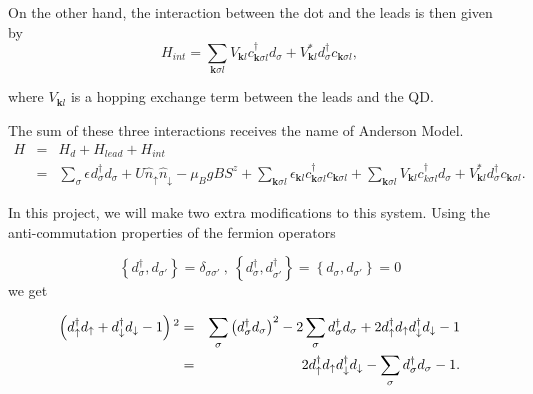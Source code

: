 On the other hand, the interaction between the dot and the leads is then given by 
\begin{equation}
H_{int} = \sum_{\mathbf{k}\sigma l}V_{\mathbf{k}l}c_{\mathbf{k}\sigma l}^{\dagger}d_{\sigma}+V_{\mathbf{k}l}^{*}d_{\sigma}^{\dagger}c_{\mathbf{k}\sigma l},
\end{equation}


\noindent where $V_{\mathbf{k}l}$ is a hopping exchange
term between the leads and the QD. 


The sum of these three interactions receives the name of Anderson Model. 
\begin{eqnarray}
H & = & H_{d}+H_{lead}+H_{int}\nonumber \\
 & = & \sum_{\sigma}\epsilon_{}d_{\sigma}^{\dagger}d_{\sigma}+U\hat{n}_{\uparrow}\hat{n}_{\downarrow}-\mu_{B}gBS^{z}+\sum_{\mathbf{k}\sigma l}\epsilon_{\mathbf{k}l}c_{\mathbf{k}\sigma l}^{\dagger}c_{\mathbf{k}\sigma l}+\sum_{\mathbf{k}\sigma l}V_{\mathbf{k}l}c_{k\sigma l}^{\dagger}d_{\sigma}+V_{\mathbf{k}l}^{*}d_{\sigma}^{\dagger}c_{\mathbf{k}\sigma l}.\label{eq:Anderson}
\end{eqnarray}

In this project, we will make two extra modifications to this system. Using the anti-commutation properties of the fermion operators

\[
\left\{ d_{\sigma}^{\dagger},d_{\sigma'}\right\} =\delta_{\sigma\sigma'}\ ,\ \left\{ d_{\sigma}^{\dagger},d_{\sigma'}^{\dagger}\right\} =\left\{ d_{\sigma},d_{\sigma'}\right\} =0
\]
\noindent we get


\begin{eqnarray*}
\left(d_{\uparrow}^{\dagger}d_{\uparrow}+d_{\downarrow}^{\dagger}d_{\downarrow}-1\right){}^{2} & = & \sum_{\sigma}\left(d_{\sigma}^{\dagger}d_{\sigma}\right)^{2}-2\sum_{\sigma}d_{\sigma}^{\dagger}d_{\sigma}+2d_{\uparrow}^{\dagger}d_{\uparrow}d_{\downarrow}^{\dagger}d_{\downarrow}-1\\
 & = & 2d_{\uparrow}^{\dagger}d_{\uparrow}d_{\downarrow}^{\dagger}d_{\downarrow}-\sum_{\sigma}d_{\sigma}^{\dagger}d_{\sigma}-1.
\end{eqnarray*}

